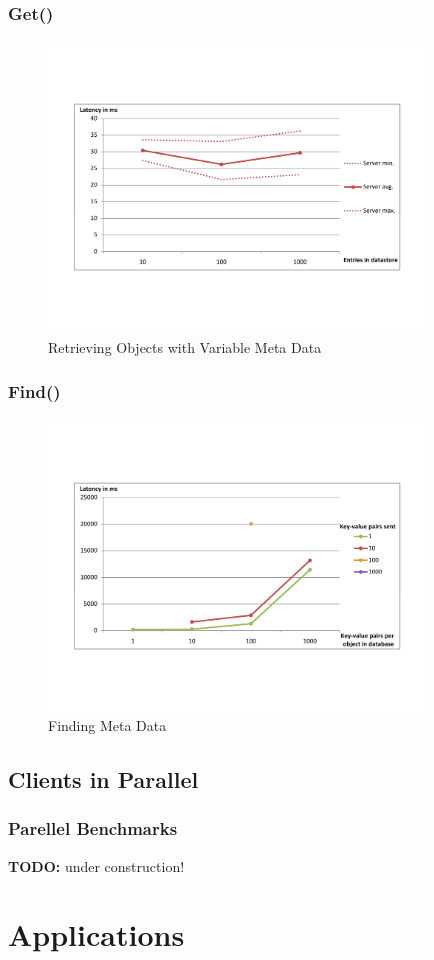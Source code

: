 \documentclass{beamer}
\begin{document}
\frame
{
	\frametitle{Get()}
	\begin{figure}[t]
	\begin{center}
	\includegraphics[trim = 0 5cm 0 5cm, width=10cm]{get_amt.pdf} 
	\caption{Retrieving Objects with Variable Meta Data}
	\end{center}
	\end{figure}
}

\frame
{
	\frametitle{Find()}
	\begin{figure}[t]
	\begin{center}
	\includegraphics[trim = 0 5cm 0 5cm, width=10cm]{find_amt.pdf} 
	\caption{Finding Meta Data}
	\end{center}
	\end{figure}
}

\subsection{Clients in Parallel}
\frame
{
	\frametitle{Parellel Benchmarks}
	\textbf{TODO:} under construction!
}

\section{Applications}
\end{document}
